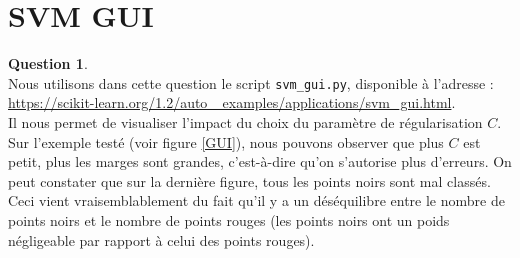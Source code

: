 \documentclass[11pt,a4paper]{article}
\theoremstyle{definition}
\newtheorem{Qu}{Question}
\begin{document}
\section{SVM GUI}

\begin{Qu}~\\

Nous utilisons dans cette question le script \texttt{svm\_gui.py}, disponible à l'adresse : \url{https://scikit-learn.org/1.2/auto_
examples/applications/svm_gui.html}.\\
Il nous permet de visualiser l'impact du choix du paramètre de régularisation $C$. Sur l'exemple testé (voir figure \ref{GUI}), nous pouvons observer que plus $C$ est petit, plus les marges sont grandes, c'est-à-dire qu'on s'autorise plus d'erreurs. On peut constater que sur la dernière figure, tous les points noirs sont mal classés. Ceci vient vraisemblablement du fait qu'il y a un déséquilibre entre le nombre de points noirs et le nombre de points rouges (les points noirs ont un poids négligeable par rapport à celui des points rouges). 


\end{Qu}
\end{document}
